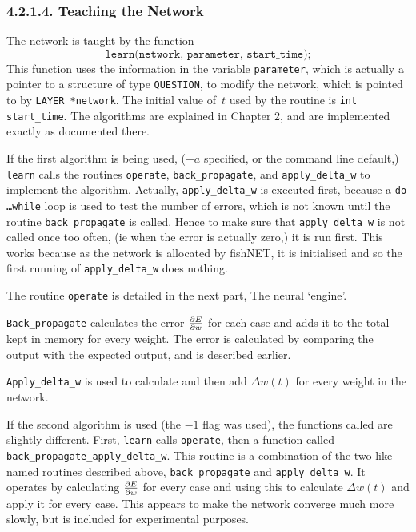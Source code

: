 \documentclass[12pt]{report}
\begin{document}
\subsubsection{4.2.1.4. Teaching the Network}

The network is taught by the function
$$
	\texttt{learn(network,\ parameter,\ start\_time);}
$$
This function uses the information in the variable \texttt{parameter},
which is actually a pointer to a structure of type \texttt{QUESTION},
to modify the network, which is pointed to by \texttt{LAYER *network}.
The initial value of~$t$ used by the routine is \texttt{int
start\_time}.
The algorithms are explained in Chapter 2, and are implemented exactly
as documented there.

If the first algorithm is being used, ($-a$ specified, or the command
line default,) \texttt{learn} calls the routines
\texttt{operate}, \texttt{back\_propagate}, and \texttt{apply\_delta\_w} to
implement the algorithm.
Actually, \texttt{apply\_delta\_w} is executed first, because a \texttt{do
\dots while} loop is used to test the number of errors, which is not
known until the routine \texttt{back\_propagate} is called.
Hence to make sure that \texttt{apply\_delta\_w} is not called once too
often, (ie when the error is actually zero,) it is run first.
This works because as the network is allocated by fishNET, it is 
initialised and so the first running of \texttt{apply\_delta\_w} does
nothing.

The routine \texttt{operate} is detailed in the next part, The neural
`engine'.

\texttt{Back\_propagate} calculates the error $\partial E \over
\partial w$ for each case and adds it to the total kept in memory
for every weight.
The error is calculated by comparing the output with the expected
output, and is described earlier.

\texttt{Apply\_delta\_w} is used to calculate and then add $\Delta
w(t)$ for every weight in the network.

If the second algorithm is used (the $-1$ flag was used), the functions 
called are slightly different.
First, \texttt{learn} calls \texttt{operate}, then a function called
\texttt{back\-\_propagate\-\_apply\-\_delta\-\_w}.
This routine is a combination of the two like--named routines
described above, \texttt{back\-\_propagate} and \texttt{apply\-\_delta\-\_w}.
It operates by calculating $\partial E \over \partial w$ for every
case and using this to calculate $\Delta w(t)$ and apply it for
every case.
This appears to make the network converge much more slowly, but is
included for experimental purposes.
\end{document}
